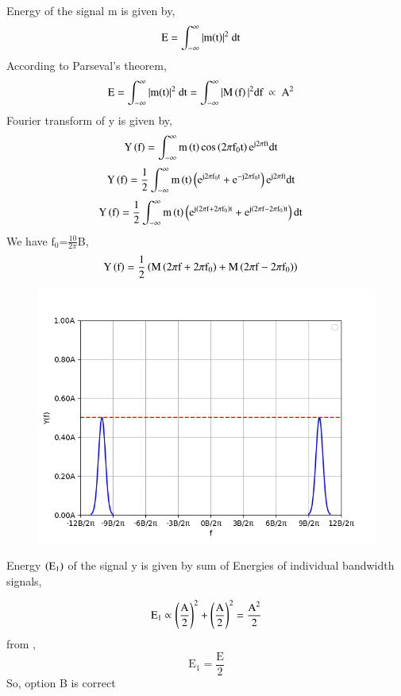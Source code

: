 \documentclass[beamer]{IEEEtran}
\theoremstyle{remark}
\begin{document}
Energy  of the signal m is given by,
\begin{align}
    \text{E}&=\int_{-\infty}^{\infty}|\text{m\brak{\text{t}}}|^2\ \text{dt}
\end{align}
According to Parseval's theorem,
\begin{align}
\label{2}
    \text{E}&=\int_{-\infty}^{\infty}|\text{m\brak{\text{t}}}|^2\ \text{dt}=\int_{-\infty}^{\infty}|\text{M}\brak{\text{f}}|^2\text{df}\ \propto\ \text{A}^2
\end{align}
Fourier transform of y is given by,
\begin{align}
\text{Y}\left(\text{f}\right)&=\int_{-\infty}^{\infty}\text{m}\left(\text{t}\right)\text{cos}\left(2\pi\text{f}_0\text{t}\right)\text{e}^{\text{j}2\pi\text{f}\text{t}}\text{dt}
\end{align}
\begin{align}
\text{Y}\left(\text{f}\right)&=\frac{1}{2}\int_{-\infty}^{\infty}\text{m}\left(\text{t}\right)\left(\text{e}^{\text{j}2\pi\text{f}_0\text{t}}+\text{e}^{-\text{j}2\pi\text{f}_0\text{t}}\right)\text{e}^{\text{j}2\pi\text{f}\text{t}}\text{dt}
\end{align}
\begin{align}
\text{Y}\left(\text{f}\right)&=\frac{1}{2}\int_{-\infty}^{\infty}\text{m}\left(\text{t}\right)\left(\text{e}^{\text{j}\left(2\pi\text{f}+2\pi\text{f}_0\right)\text{t}}+\text{e}^{\text{j}\left(2\pi\text{f}-2\pi\text{f}_0\right)\text{t}}\right)\text{dt}
\end{align}
We have $\text{f}_0$=$\frac{10}{2\pi}$B,
\begin{align}
\label{1}
\text{Y}\left(\text{f}\right)&=\frac{1}{2}\left(\text{M}\left(2\pi\text{f}+2\pi\text{f}_0\right)+\text{M}\left(2\pi\text{f}-2\pi\text{f}_0\right)\right)
\end{align}

\begin{figure}[h]
    \centering
    \includegraphics[scale=0.50]{figs/ec,27(1).png}
    \label{fig:enter-label}
\end{figure}

Energy $\left(\text{E}_1\right)$ of the signal y is given by sum of Energies of individual bandwidth signals,

$$\text{E}_1\propto \left(\frac{\text{A}}{2}\right)^2+\left(\frac{\text{A}}{2}\right)^2=\frac{\text{A}^2}{2}$$
from \brak{\ref{2}},\\
$$\text{E}_1=\frac{\text{E}}{2}$$
So, option B is correct
\end{document}
